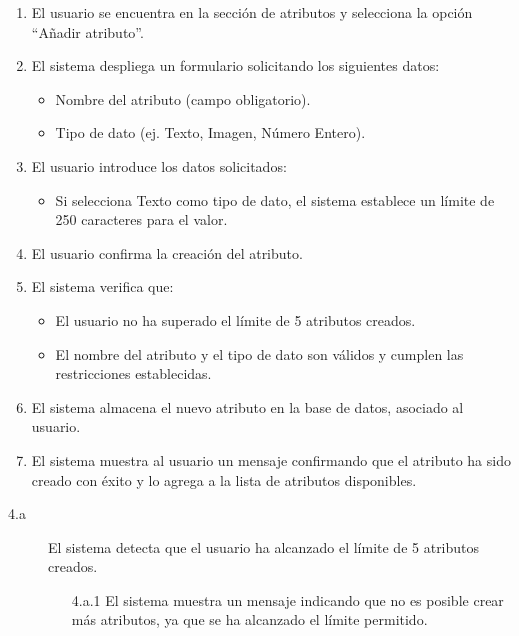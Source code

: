 \begin{enumerate}
    \item El usuario se encuentra en la sección de atributos y selecciona la opción \enquote{Añadir atributo}.
    \item El sistema despliega un formulario solicitando los siguientes datos:
    \begin{itemize}
        \item Nombre del atributo (campo obligatorio).
        \item Tipo de dato (ej. Texto, Imagen, Número Entero).
    \end{itemize}
    \item El usuario introduce los datos solicitados:
    \begin{itemize}
        \item Si selecciona Texto como tipo de dato, el sistema establece un límite de 250 caracteres para el valor.
    \end{itemize}
    \item El usuario confirma la creación del atributo.
    \item El sistema verifica que:
    \begin{itemize}
        \item El usuario no ha superado el límite de 5 atributos creados.
        \item El nombre del atributo y el tipo de dato son válidos y cumplen las restricciones establecidas.
    \end{itemize}
    \item El sistema almacena el nuevo atributo en la base de datos, asociado al usuario.
    \item El sistema muestra al usuario un mensaje confirmando que el atributo ha sido creado con éxito y lo agrega a la lista de atributos disponibles.
\end{enumerate}

\begin{description}
    \item[4.a] El sistema detecta que el usuario ha alcanzado el límite de 5 atributos creados.
    \begin{enumerate}
        \item[4.a.1] El sistema muestra un mensaje indicando que no es posible crear más atributos, ya que se ha alcanzado el límite permitido.
    \end{enumerate}
\end{description}


